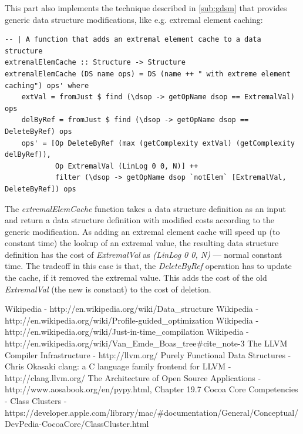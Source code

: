 \documentclass[a4paper,11pt]{article}
\begin{document}
\begin{appendices}
		This part also implements the technique described in \autoref{sub:gdsm} that provides generic 
		data structure modifications, like e.g. extremal element caching:
\begin{verbatim}
-- | A function that adds an extremal element cache to a data structure
extremalElemCache :: Structure -> Structure
extremalElemCache (DS name ops) = DS (name ++ " with extreme element caching") ops' where
    extVal = fromJust $ find (\dsop -> getOpName dsop == ExtremalVal) ops
    delByRef = fromJust $ find (\dsop -> getOpName dsop == DeleteByRef) ops
    ops' = [Op DeleteByRef (max (getComplexity extVal) (getComplexity delByRef)),
            Op ExtremalVal (LinLog 0 0, N)] ++
            filter (\dsop -> getOpName dsop `notElem` [ExtremalVal, DeleteByRef]) ops
\end{verbatim}
	The \emph{extremalElemCache} function takes a data structure definition as an input and 
	return a data structure definition with modified costs according to the generic modification.
	As adding an extremal element cache will speed up (to constant time) the lookup of an 
	extremal value, the resulting data structure definition has the cost of \emph{ExtremalVal}
	as \emph{(LinLog 0 0, N)} --- normal constant time. The tradeoff in this case is that, 
	the \emph{DeleteByRef} operation has to update the cache, if it removed the extremal value.
	This adds the cost of the old \emph{ExtremalVal} (the new is constant) to the cost of 
	deletion.
		
		
\end{appendices}

\newpage
\begin{thebibliography}{9}
	 Wikipedia - http://en.wikipedia.org/wiki/Data\_structure
     Wikipedia - http://en.wikipedia.org/wiki/Profile-guided\_optimization
     Wikipedia - http://en.wikipedia.org/wiki/Just-in-time\_compilation
     Wikipedia - http://en.wikipedia.org/wiki/Van\_Emde\_Boas\_tree\#cite\_note-3
	 The LLVM Compiler Infrastructure - http://llvm.org/
	 Purely Functional Data Structures - Chris Okasaki
	 clang: a C language family frontend for LLVM - http://clang.llvm.org/
	 The Architecture of Open Source Applications - http://www.aosabook.org/en/pypy.html, Chapter 19.7
	 Cocoa Core Competencies - Class Clusters - \\
		https://developer.apple.com/library/mac/\#documentation/General/Conceptual/DevPedia-CocoaCore/ClassCluster.html
\end{thebibliography}
\end{document}
